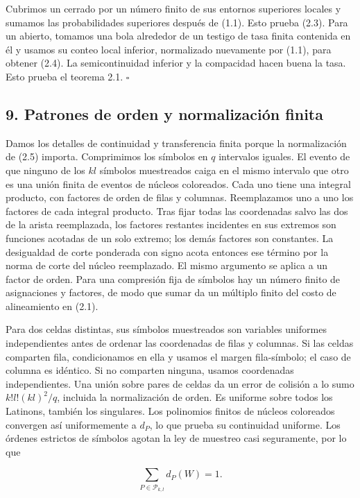 \documentclass[spanish,11pt,a4paper]{article}
\begin{document}
Cubrimos un cerrado por un número finito de sus entornos superiores locales y sumamos las probabilidades superiores después de (1.1). Esto prueba (2.3). Para un abierto, tomamos una bola alrededor de un testigo de tasa finita contenida en él y usamos su conteo local inferior, normalizado nuevamente por (1.1), para obtener (2.4). La semicontinuidad inferior y la compacidad hacen buena la tasa. Esto prueba el teorema 2.1. \(\square\)

\subsection{9. Patrones de orden y normalización finita}\label{patrones-de-orden-y-normalizaciuxf3n-finita}

Damos los detalles de continuidad y transferencia finita porque la normalización de (2.5) importa. Comprimimos los símbolos en \(q\) intervalos iguales. El evento de que ninguno de los \(kl\) símbolos muestreados caiga en el mismo intervalo que otro es una unión finita de eventos de núcleos coloreados. Cada uno tiene una integral producto, con factores de orden de filas y columnas. Reemplazamos uno a uno los factores de cada integral producto. Tras fijar todas las coordenadas salvo las dos de la arista reemplazada, los factores restantes incidentes en sus extremos son funciones acotadas de un solo extremo; los demás factores son constantes. La desigualdad de corte ponderada con signo acota entonces ese término por la norma de corte del núcleo reemplazado. El mismo argumento se aplica a un factor de orden. Para una compresión fija de símbolos hay un número finito de asignaciones y factores, de modo que sumar da un múltiplo finito del costo de alineamiento en (2.1).

Para dos celdas distintas, sus símbolos muestreados son variables uniformes independientes antes de ordenar las coordenadas de filas y columnas. Si las celdas comparten fila, condicionamos en ella y usamos el margen fila-símbolo; el caso de columna es idéntico. Si no comparten ninguna, usamos coordenadas independientes. Una unión sobre pares de celdas da un error de colisión a lo sumo \(k!l!(kl)^2/q\), incluida la normalización de orden. Es uniforme sobre todos los Latinons, también los singulares. Los polinomios finitos de núcleos coloreados convergen así uniformemente a \(d_P\), lo que prueba su continuidad uniforme. Los órdenes estrictos de símbolos agotan la ley de muestreo casi seguramente, por lo que

\nopagebreak[4]
\[\sum_{P\in\mathcal P_{k,l}}d_P(W)=1.\tag{9.1}\]
\end{document}
